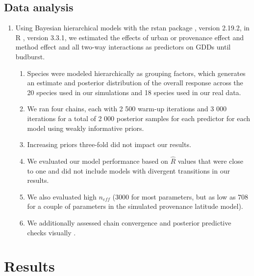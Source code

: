 \documentclass{article}\usepackage[]{graphicx}\usepackage[]{color}
\begin{document}
\subsection*{Data analysis}
\begin{enumerate}
\item Using Bayesian hierarchical models with the rstan package \citep{rstan2019}, version 2.19.2,  in R \citep{R}, version 3.3.1, we estimated the effects of urban or provenance effect and method effect and all two-way interactions as predictors on GDDs until budburst. 
  \begin{enumerate} 
  \item Species were modeled hierarchically as grouping factors, which generates an estimate and posterior distribution of the overall response across the 20 species used in our simulations and 18 species used in our real data.
  \item We ran four chains, each with 2 500 warm-up iterations and 3 000 iterations for a total of 2 000 posterior samples for each predictor for each model using weakly informative priors.
  \item Increasing priors three-fold did not impact our results.
  \item We evaluated our model performance based on $\hat{R}$ values that were close to one and did not include models with divergent transitions in our results. 
  \item We also evaluated high $n_{eff}$ (3000 for most parameters, but as low as 708 for a couple of parameters in the simulated provenance latitude model). 
  \item We additionally assessed chain convergence and posterior predictive checks visually \citep{BDA}.
  \end{enumerate}
\end{enumerate}

\section*{Results}
\end{document}
